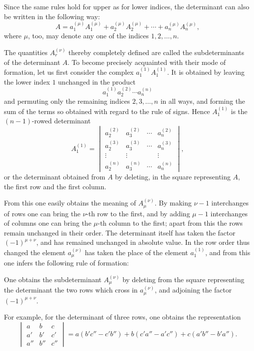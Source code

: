 \documentclass[11pt]{article}
\begin{document}
Since the same rules hold for upper as for lower indices, the determinant can also be written in the following way:
\begin{equation}
 A=a_1^{(\mu)}A_1^{(\mu)}+a_2^{(\mu)}A_2^{(\mu)}
 +\cdots+a_n^{(\mu)}A_n^{(\mu)},
\tag{3}
\end{equation}
where \(\mu\), too, may denote any one of the indices \(1,2,\ldots,n\).

The quantities \(A_r^{(\nu)}\) thereby completely defined are called the subdeterminants of the determinant \(A\). To become precisely acquainted with their mode of formation, let us first consider the complex \(a_1^{(1)}A_1^{(1)}\). It is obtained by leaving the lower index \(1\) unchanged in the product
\[
 a_1^{(1)}a_2^{(2)}\cdots a_n^{(n)}
\]
and permuting only the remaining indices \(2,3,\ldots,n\) in all ways, and forming the sum of the terms so obtained with regard to the rule of signs. Hence \(A_1^{(1)}\) is the \((n-1)\)-rowed determinant
\begin{equation}
 A_1^{(1)}=
\begin{vmatrix}
a_2^{(2)}&a_3^{(2)}&\cdots&a_n^{(2)}\\
a_2^{(3)}&a_3^{(3)}&\cdots&a_n^{(3)}\\
\vdots&\vdots&&\vdots\\
a_2^{(n)}&a_3^{(n)}&\cdots&a_n^{(n)}
\end{vmatrix},
\tag{4}
\end{equation}
or the determinant obtained from \(A\) by deleting, in the square representing \(A\), the first row and the first column.

From this one easily obtains the meaning of \(A_\mu^{(\nu)}\). By making \(\nu-1\) interchanges of rows one can bring the \(\nu\)-th row to the first, and by adding \(\mu-1\) interchanges of columns one can bring the \(\mu\)-th column to the first; apart from this the rows remain unchanged in their order. The determinant itself has taken the factor \((-1)^{\mu+\nu}\), and has remained unchanged in absolute value. In the row order thus changed the element \(a_\mu^{(\nu)}\) has taken the place of the element \(a_1^{(1)}\), and from this one infers the following rule of formation:

One obtains the subdeterminant \(A_\mu^{(\nu)}\) by deleting from the square representing the determinant the two rows which cross in \(a_\mu^{(\nu)}\), and adjoining the factor \((-1)^{\mu+\nu}\).

For example, for the determinant of three rows, one obtains the representation
\begin{equation}
\begin{vmatrix}
a&b&c\\
a'&b'&c'\\
a''&b''&c''
\end{vmatrix}
=a(b'c''-c'b'')+b(c'a''-a'c'')+c(a'b''-b'a'').
\tag{5}
\end{equation}
\end{document}
